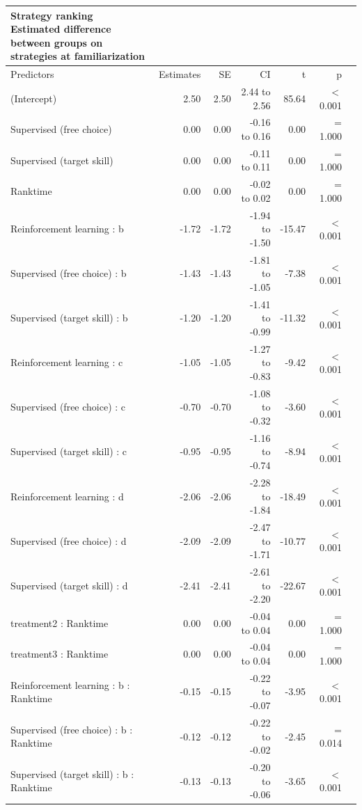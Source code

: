 \documentclass{article}
\begin{document}
\setlength{\LTpost}{0mm}
\begin{longtable}{lrrrrrl}
\caption*{
{\large Strategy ranking} \\ 
{\small Estimated difference between groups on strategies at familiarization}
} \\ 
\toprule
Predictors & Estimates & SE & CI & t & p \\ 
\midrule\addlinespace[2.5pt]
(Intercept) & 2.50 & 2.50 & 2.44 to 2.56 & 85.64 &  $<$  0.001 \\ 
Supervised (free choice) & 0.00 & 0.00 & -0.16 to 0.16 & 0.00 &  =  1.000 \\ 
Supervised (target skill) & 0.00 & 0.00 & -0.11 to 0.11 & 0.00 &  =  1.000 \\ 
Ranktime & 0.00 & 0.00 & -0.02 to 0.02 & 0.00 &  =  1.000 \\ 
Reinforcement learning : b & -1.72 & -1.72 & -1.94 to -1.50 & -15.47 &  $<$ 0.001 \\ 
Supervised (free choice) : b & -1.43 & -1.43 & -1.81 to -1.05 & -7.38 &  $<$ 0.001 \\ 
Supervised (target skill) : b & -1.20 & -1.20 & -1.41 to -0.99 & -11.32 &  $<$  0.001 \\ 
Reinforcement learning : c & -1.05 & -1.05 & -1.27 to -0.83 & -9.42 &  $<$  0.001 \\ 
Supervised (free choice) : c & -0.70 & -0.70 & -1.08 to -0.32 & -3.60 &  $<$  0.001 \\ 
Supervised (target skill) : c & -0.95 & -0.95 & -1.16 to -0.74 & -8.94 &  $<$  0.001 \\ 
Reinforcement learning : d & -2.06 & -2.06 & -2.28 to -1.84 & -18.49 &  $<$  0.001 \\ 
Supervised (free choice) : d & -2.09 & -2.09 & -2.47 to -1.71 & -10.77 &  $<$  0.001 \\ 
Supervised (target skill) : d & -2.41 & -2.41 & -2.61 to -2.20 & -22.67 &  $<$  0.001 \\ 
treatment2 : Ranktime & 0.00 & 0.00 & -0.04 to 0.04 & 0.00 &  =  1.000 \\ 
treatment3 : Ranktime & 0.00 & 0.00 & -0.04 to 0.04 & 0.00 &  =  1.000 \\ 
Reinforcement learning : b : Ranktime & -0.15 & -0.15 & -0.22 to -0.07 & -3.95 &  $<$  0.001 \\ 
Supervised (free choice) : b : Ranktime & -0.12 & -0.12 & -0.22 to -0.02 & -2.45 &  =  0.014 \\ 
Supervised (target skill) : b : Ranktime & -0.13 & -0.13 & -0.20 to -0.06 & -3.65 &  $<$  0.001 \\ 

\end{longtable}
\end{document}
